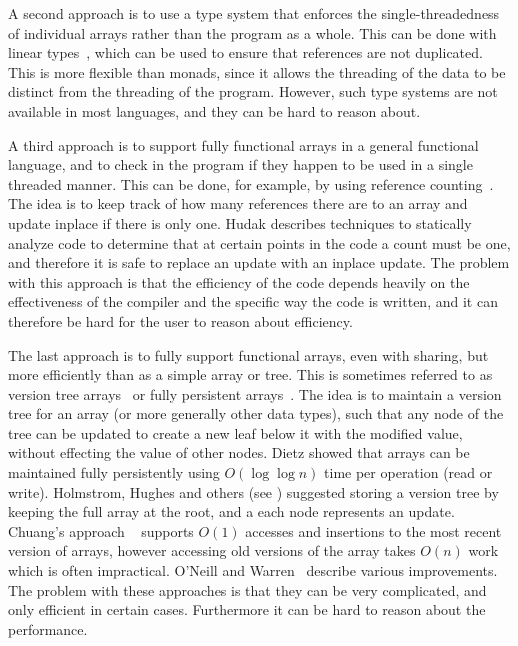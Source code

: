 A second approach is to use a type system that enforces the
single-threadedness of individual arrays rather than the program as a
whole.  This can be done with linear types~\cite{Girard87,Wadler90},
which can be used to ensure that references are not duplicated.  This
is more flexible than monads, since it allows the threading of the
data to be distinct from the threading of the program.  However, such
type systems are not available in most languages, and they can be hard
to reason about.

A third approach is to support fully functional arrays in a general
functional language, and to check in the program if they happen to be
used in a single threaded manner.  This can be done, for example, by
using reference counting~\cite{HB85,Hudak86}.  The idea is to keep
track of how many references there are to an array and update inplace
if there is only one.  Hudak describes techniques to statically
analyze code to determine that at certain points in the code a count
must be one, and therefore it is safe to replace an update with an
inplace update.  The problem with this approach is that the efficiency
of the code depends heavily on the effectiveness of the compiler and
the specific way the code is written, and it can therefore be hard for
the user to reason about efficiency.

The last approach is to fully support functional arrays, even with
sharing, but more efficiently than as a simple array or tree.  This is
sometimes referred to as version tree arrays~\cite{AHN88} or fully
persistent arrays~\cite{DSST89}.  The idea is to maintain a version
tree for an array (or more generally other data types), such that any
node of the tree can be updated to create a new leaf below it with the
modified value, without effecting the value of other nodes.  Dietz
showed that arrays can be maintained fully persistently using
$O(\log\log n)$ time per operation (read or write).  Holmstrom, Hughes
and others (see \cite{AHN88}) suggested storing a version tree by
keeping the full array at the root, and a each node represents an
update.  Chuang's approach ~\cite{chuang} supports $O(1)$ accesses and
insertions to the most recent version of arrays, however accessing old
versions of the array takes $O(n)$ work which is often impractical.
O'Neill and Warren~\cite{oneill} describe various improvements.
The problem with these approaches is that they can be very complicated,
and only efficient in certain cases.   Furthermore it can be hard to
reason about the performance.

